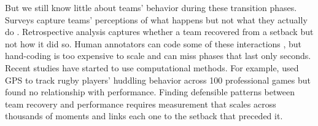 \documentclass[12pt]{article}          %
\begin{document}

But we still know little about teams' behavior during these transition phases. Surveys capture teams' perceptions of what happens but not what they actually do \citep{WallerandKaplan}. Retrospective analysis captures whether a team recovered from a setback but not how it did so. Human annotators can code some of these interactions \citep{kraus2010, durdubas2021}, but hand-coding is too expensive to scale and can miss phases that last only seconds. Recent studies have started to use computational methods. For example, \cite{Serpell2023} used GPS to track rugby players' huddling behavior across 100 professional games but found no relationship with performance. Finding defensible patterns between team recovery and performance requires measurement that scales across thousands of moments and links each one to the setback that preceded it.

\end{document}
